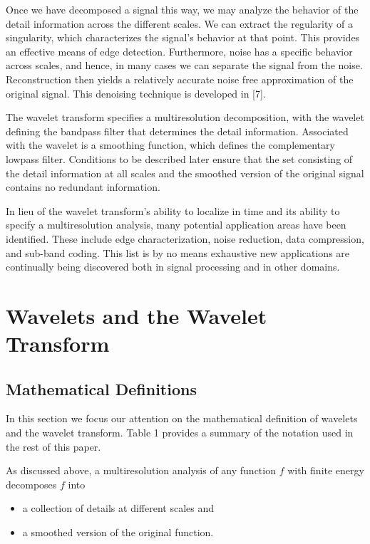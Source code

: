\documentclass[a4paper,12pt]{article}
\begin{document}
Once we have decomposed a signal this way, we may analyze the behavior of the detail information across the different
scales. We can extract the regularity of a singularity, which characterizes the signal's behavior at that point. This
provides an effective means of edge detection. Furthermore, noise has a specific behavior across scales, and hence, in
many cases we can separate the signal from the noise. Reconstruction then yields a relatively accurate noise free
approximation of the original signal. This denoising technique is developed in [7].

The wavelet transform specifies a multiresolution decomposition, with the wavelet defining the bandpass filter that
determines the detail information. Associated with the wavelet is a smoothing function, which defines the complementary
lowpass filter. Conditions to be described later ensure that the set consisting of the detail information at all scales
and the smoothed version of the original signal contains no redundant information.

In lieu of the wavelet transform's ability to localize in time and its ability to specify a multiresolution analysis,
many potential application areas have been identified. These include edge characterization, noise reduction, data
compression, and sub-band coding. This list is by no means exhaustive {\textendash} new applications are continually
being discovered both in signal processing and in other domains.

\section{Wavelets and the Wavelet Transform}

\subsection{Mathematical Definitions}

In this section we focus our attention on the mathematical definition of wavelets and the wavelet transform.
Table 1 provides a summary of the notation used in the rest of this paper.

As discussed above, a multiresolution analysis of any function \(f\) with finite energy decomposes \(f\) into

\begin{itemize}
\item a collection of details at different scales and
\item a smoothed version of the original function.
\end{itemize}
\end{document}
